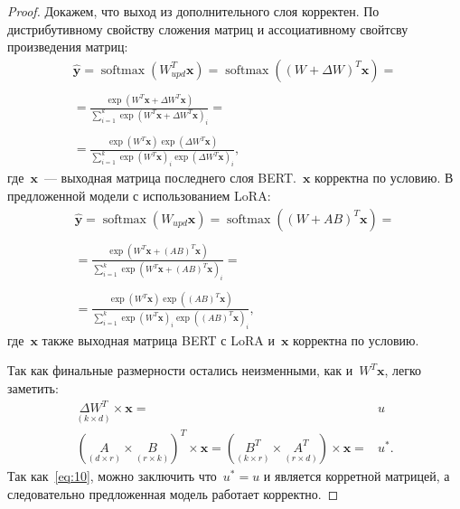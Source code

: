 \begin{proof} 
Докажем, что выход из дополнительного слоя корректен. По дистрибутивному свойству сложения матриц и ассоциативному свойтсву произведения матриц: 
\begin{equation}
\label{eq:9}
\begin{aligned}
\hat{\mathbf{y}} = \operatorname{softmax}\left(W_{upd}^T \mathbf{x}\right) =
\operatorname{softmax}\left((W + \Delta W)^T \mathbf{x}\right) =\\ \\
= \frac{\exp \left(W^T \mathbf{x} + \Delta W^T \mathbf{x}\right)}{\sum_{i=1}^k \exp \left(W^T \mathbf{x} + \Delta W^T \mathbf{x}\right)_i}=\\ \\
= \frac{\exp \left(W^T \mathbf{x}\right) \exp \left(\Delta W^T \mathbf{x}\right)}{\sum_{i=1}^k \exp \left(W^T \mathbf{x}\right)_i \exp \left(\Delta W^T \mathbf{x}\right)_i},
\end{aligned}
\end{equation} 
где~$\mathbf{x}$~--- выходная матрица последнего слоя BERT.~$\mathbf{x}$ корректна по условию. В предложенной модели с использованием LoRA:
\begin{equation}
\label{eq:10}
\begin{aligned}
\hat{\mathbf{y}} = \operatorname{softmax}\left(W_{upd} \mathbf{x}\right) =
\operatorname{softmax}\left((W + AB)^T \mathbf{x}\right) =\\ \\
= \frac{\exp \left(W^T \mathbf{x} + (AB)^T \mathbf{x}\right)}{\sum_{i=1}^k \exp \left(W^T \mathbf{x} + (AB)^T \mathbf{x}\right)_i}=\\ \\
= \frac{\exp \left(W^T \mathbf{x}\right) \exp \left((AB)^T \mathbf{x}\right)}{\sum_{i=1}^k \exp \left(W^T \mathbf{x}\right)_i \exp \left((AB)^T \mathbf{x}\right)_i},
\end{aligned}
\end{equation} 
где~$\mathbf{x}$ также выходная матрица BERT с LoRA и~$\mathbf{x}$ корректна по условию. 

Так как финальные размерности остались неизменными, как и~$W^T\mathbf{x}$, легко заметить: 
\begin{equation}
\label{eq:11}
\begin{aligned}
 \underset{(k \times d)}{\Delta W^T} \times \mathbf{x} =& u\\
(\underset{(d \times r)}{A} \times \underset{(r \times k)}{B})^T \times \mathbf{x} = (\underset{(k \times r)}{B^T} \times \underset{(r \times d)}{A^T}) \times \mathbf{x} =& u^*.
\end{aligned}
\end{equation}
Так как~\eqref{eq:10}, можно заключить что~${u^*} = {u}$ и является корретной матрицей, а следовательно предложенная модель работает корректно.
\end{proof}
